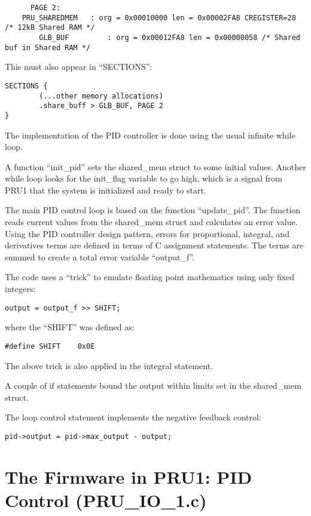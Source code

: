 \begin{verbatim}
	  PAGE 2:
	PRU_SHAREDMEM	: org = 0x00010000 len = 0x00002FA8 CREGISTER=28 /* 12kB Shared RAM */
        GLB_BUF         : org = 0x00012FA8 len = 0x00000058 /* Shared buf in Shared RAM */
\end{verbatim}

This must also appear in ``SECTIONS'':

\begin{verbatim}
SECTIONS {
        (...other memory allocations)
        .share_buff > GLB_BUF, PAGE 2
}
\end{verbatim}

The implementation of the PID controller is done using the usual infinite while loop.

A function ``init\_pid'' sets the shared\_mem struct to some initial values.  Another while loop looks for the init\_flag variable to go high, which is a signal from PRU1 that the system is initialized and ready to start.

The main PID control loop is based on the function ``update\_pid''.  The function reads current values from the shared\_mem struct and calculates an error value.  Using the PID controller design pattern, errors for proportional, integral, and derivatives terms are defined in terms of C assignment statements.  The terms are summed to create a total error variable ``output\_f''.

The code uses a ``trick'' to emulate floating point mathematics using only fixed integers:

\begin{verbatim}
output = output_f >> SHIFT;
\end{verbatim}

where the ``SHIFT'' was defined as:

\begin{verbatim}
#define SHIFT    0x0E
\end{verbatim}

The above trick is also applied in the integral statement.

A couple of if statements bound the output within limits set in the shared\_mem struct.

The loop control statement implements the negative feedback control:

\begin{verbatim}
pid->output = pid->max_output - output;
\end{verbatim}

\section{The Firmware in PRU1: PID Control (PRU\_IO\_1.c)}

